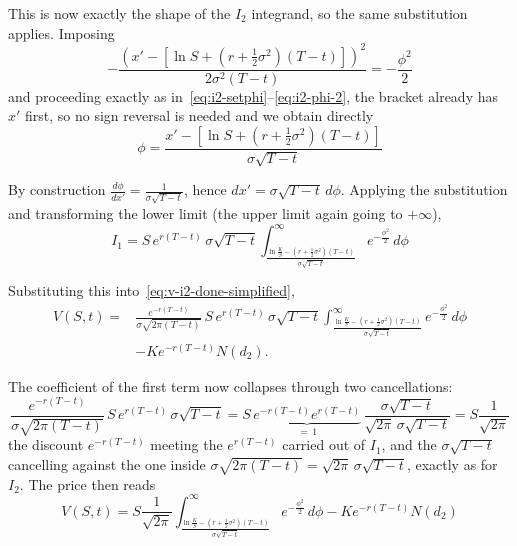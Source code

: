 \documentclass[a4paper,12pt]{article}
\numberwithin{equation}{section}
\begin{document}
This is now exactly the shape of the $I_2$ integrand, so the same substitution
applies. Imposing
\begin{equation}\label{eq:i1-setphi}
  -\frac{\left(x' - \left[\ln S + \left(r + \frac{1}{2}\sigma^2\right)(T-t)\right]\right)^2}{2\sigma^2(T-t)}
    = -\frac{\phi^2}{2}
\end{equation}
and proceeding exactly as in~\eqref{eq:i2-setphi}--\eqref{eq:i2-phi-2}, the bracket
already has $x'$ first, so no sign reversal is needed and we obtain directly
\begin{equation}\label{eq:i1-phi}
  \phi = \frac{x' - \left[\ln S + \left(r + \frac{1}{2}\sigma^2\right)(T-t)\right]}{\sigma\sqrt{T-t}} 
\end{equation}

By construction $\frac{d\phi}{dx'} = \frac{1}{\sigma\sqrt{T-t}}$, hence
$dx' = \sigma\sqrt{T-t}\,d\phi$. Applying the substitution and transforming the
lower limit (the upper limit again going to $+\infty$),
\begin{equation}\label{eq:i1-after-sub-6}
    I_1 = S\,e^{r(T-t)}\,\sigma\sqrt{T-t}
    \int_{\frac{\ln\frac{K}{S} - \left(r + \frac{1}{2}\sigma^2\right)(T-t)}{\sigma\sqrt{T-t}}}^{\infty}
    e^{-\frac{\phi^2}{2}}\,d\phi 
\end{equation}

Substituting this into~\eqref{eq:v-i2-done-simplified},
\begin{equation}\label{eq:v-i1-done}
\begin{aligned}
  V(S,t) = {}&\frac{e^{-r(T-t)}}{\sigma\sqrt{2\pi(T-t)}}\,
    S\,e^{r(T-t)}\,\sigma\sqrt{T-t}
    \int_{\frac{\ln\frac{K}{S} - \left(r + \frac{1}{2}\sigma^2\right)(T-t)}{\sigma\sqrt{T-t}}}^{\infty}
    e^{-\frac{\phi^2}{2}}\,d\phi \\
    &- K e^{-r(T-t)} N(d_2) .
\end{aligned}
\end{equation}

The coefficient of the first term now collapses through two cancellations:
\[
  \frac{e^{-r(T-t)}}{\sigma\sqrt{2\pi(T-t)}}\,S\,e^{r(T-t)}\,\sigma\sqrt{T-t}
  = S\,\underbrace{e^{-r(T-t)}e^{r(T-t)}}_{=\,1}\,
    \frac{\sigma\sqrt{T-t}}{\sqrt{2\pi}\,\sigma\sqrt{T-t}}
  = S\frac{1}{\sqrt{2\pi}} 
\]
the discount $e^{-r(T-t)}$ meeting the $e^{r(T-t)}$ carried out of $I_1$, and the
$\sigma\sqrt{T-t}$ cancelling against the one inside
$\sigma\sqrt{2\pi(T-t)} = \sqrt{2\pi}\,\sigma\sqrt{T-t}$, exactly as for $I_2$. The
price then reads
\begin{equation}\label{eq:v-i1-collapsed}
  V(S,t) = S\frac{1}{\sqrt{2\pi}}
    \int_{\frac{\ln\frac{K}{S} - \left(r + \frac{1}{2}\sigma^2\right)(T-t)}{\sigma\sqrt{T-t}}}^{\infty}
    e^{-\frac{\phi^2}{2}}\,d\phi
    - K e^{-r(T-t)} N(d_2) 
\end{equation}
\end{document}
